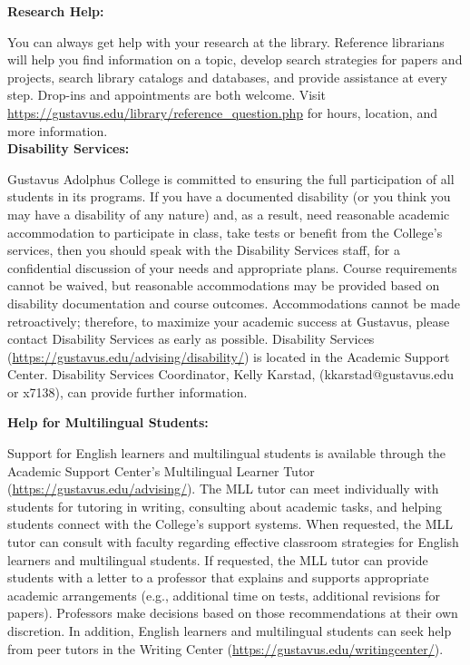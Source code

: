 \documentclass[11pt]{article}
\begin{document}
\textbf{\large Research Help:}

\hspace{3mm}
\hangindent=5mm You can always get help with your research at the library. Reference librarians will help you find information on a topic, develop search strategies for papers and projects, search library catalogs and databases, and provide assistance at every step. Drop-ins and appointments are both welcome. Visit \url{https://gustavus.edu/library/reference_question.php} for hours, location, and more information.\\

\textbf {\large Disability Services:}

\hspace{3mm}
\hangindent=5mm Gustavus Adolphus College is committed to ensuring the full participation of all students in its programs. If you have a documented disability (or you think you may have a disability of any nature) and, as a result, need reasonable academic accommodation to participate in class, take tests or benefit from the College’s services, then you should speak with the Disability Services staff, for a confidential discussion of your needs and appropriate plans. Course requirements cannot be waived, but reasonable accommodations may be provided based on disability documentation and course outcomes. Accommodations cannot be made retroactively; therefore, to maximize your academic success at Gustavus, please contact Disability Services as early as possible. Disability Services (\url{https://gustavus.edu/advising/disability/}) is located in the Academic Support Center. Disability Services Coordinator, Kelly Karstad, (kkarstad@gustavus.edu or x7138), can provide further information.\\

\newpage

\textbf{\large Help for Multilingual Students:}

\hspace{3mm}
\hangindent=5mm Support for English learners and multilingual students is available through the Academic Support Center’s Multilingual Learner Tutor (\url{https://gustavus.edu/advising/}). The MLL tutor can meet individually with students for tutoring in writing, consulting about academic tasks, and helping students connect with the College’s support systems. When requested, the MLL tutor can consult with faculty regarding effective classroom strategies for English learners and multilingual students. If requested, the MLL tutor can provide students with a letter to a professor that explains and supports appropriate academic arrangements (e.g., additional time on tests, additional revisions for papers). Professors make decisions based on those recommendations at their own discretion. In addition, English learners and multilingual students can seek help from peer tutors in the Writing Center (\url{https://gustavus.edu/writingcenter/}).\\
\end{document}
